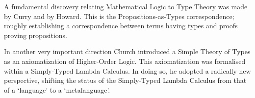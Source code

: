 \documentclass[11pt,twocolumn]{article}
\newcommand{\hide}[1]{}
\newcommand{\ie}{\emph{ie.}}
\newcommand{\cf}{\emph{cf.}}
\begin{document}
A fundamental discovery relating Mathematical Logic to Type Theory was
made by Curry and by Howard.
This is the Propositions-as-Types correspondence; roughly establishing a
correspondence between terms having types and proofs proving propositions.

In another very important direction Church introduced a Simple Theory of
Types %
as an axiomatization of Higher-Order Logic.
This axiomatization was formalised within a Simply-Typed Lambda Calculus.
In doing so, he adopted a radically new perspective, shifting the status
of the Simply-Typed Lambda Calculus from that of a `language' to a
`metalanguage'. %
\hide{
  When regarded as a metalanguage, the Simply-Typed
Lambda Calculus is considered as an equational theory. %
}
\end{document}
